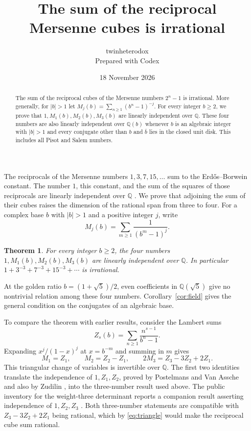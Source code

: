 \documentclass[11pt]{article}
\title{\Large\bfseries The sum of the reciprocal Mersenne cubes is irrational}
\author{twinheterodox\\[2pt]\normalsize Prepared with Codex}
\date{18 November 2026}
\newtheorem{theorem}{Theorem}
\newcommand{\Q}{\mathbb Q}
\begin{document}
\maketitle

\begin{abstract}
The sum of the reciprocal cubes of the Mersenne numbers \(2^n-1\) is
irrational. More generally, for \(|b|>1\) let
\(M_j(b)=\sum_{n\ge1}(b^n-1)^{-j}\).
For every integer \(b\ge2\), we prove that \(1,M_1(b),M_2(b),M_3(b)\)
are linearly independent over \(\Q\). These four numbers are also
linearly independent over \(\Q(b)\) whenever \(b\) is an algebraic
integer with \(|b|>1\) and every conjugate other than \(b\) and
\(\bar b\) lies in the closed unit disk. This includes all Pisot and
Salem numbers.
\end{abstract}

The reciprocals of the Mersenne numbers \(1,3,7,15,\ldots\) sum to
the Erd\H{o}s--Borwein constant. The number \(1\), this constant, and
the sum of the squares of those reciprocals are linearly independent
over \(\Q\) \cite[Theorem~1.3]{PVA}. We prove that adjoining the sum
of their cubes raises the dimension of the rational span from three
to four. For a complex base \(b\) with \(|b|>1\) and a positive
integer \(j\), write
\[
                  M_j(b)=\sum_{m\ge1}\frac{1}{(b^m-1)^j}.
\]

\begin{theorem}\label{thm:main}
For every integer \(b\ge2\), the four numbers
\(1,M_1(b),M_2(b),M_3(b)\) are linearly independent over \(\Q\).
In particular \(1+3^{-3}+7^{-3}+15^{-3}+\cdots\) is irrational.
\end{theorem}

At the golden ratio \(b=(1+\sqrt5)/2\), even coefficients in
\(\Q(\sqrt5)\) give no nontrivial relation among these four numbers.
Corollary~\ref{cor:field} gives the general condition on the
conjugates of an algebraic base.

To compare the theorem with earlier results, consider the Lambert sums
\[
                     Z_s(b)=\sum_{n\ge1}\frac{n^{s-1}}{b^n-1}.
\]
Expanding \(x^j/(1-x)^j\) at \(x=b^{-m}\) and summing in \(m\) gives
\begin{equation}\label{eq:triangle}
 M_1=Z_1,\qquad M_2=Z_2-Z_1,\qquad
 2M_3=Z_3-3Z_2+2Z_1 .
\end{equation}
This triangular change of variables is invertible over \(\Q\).
The first two identities translate the independence of \(1,Z_1,Z_2\),
proved by Postelmans and Van Assche and also by Zudilin
\cite[Theorem~2]{ZudPair}, into the three-number result used above.
The public inventory for the weight-three determinant reports a
companion result asserting independence of \(1,Z_2,Z_3\)
\cite[entry FUT-LI]{UpliftCompanion}.
Both three-number statements are compatible with \(Z_3-3Z_2+2Z_1\) being rational,
which by \eqref{eq:triangle} would make the reciprocal cube sum rational.
\end{document}

